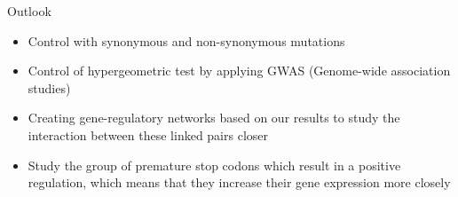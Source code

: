 \documentclass{beamer}
\begin{document}
\begin{frame}{Outlook}
	\begin{itemize}
	\item Control with synonymous and non-synonymous mutations
	\item Control of hypergeometric test by applying GWAS (Genome-wide association studies)
	\item Creating gene-regulatory networks based on our results to study the interaction between these linked pairs closer 
	\item Study the group of premature stop codons which result in a positive regulation, which means that they increase their gene expression more closely 
	\end{itemize}
\end{frame}
\end{document}
